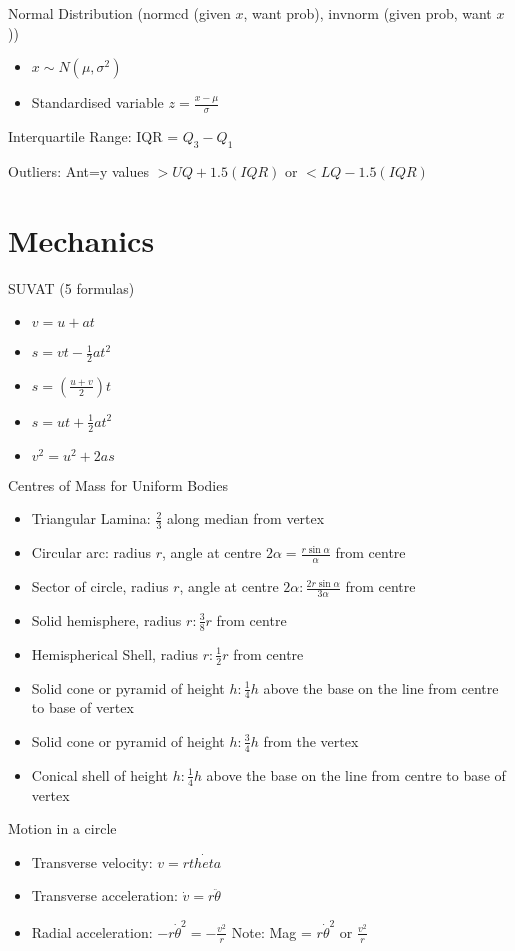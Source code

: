 \documentclass[10pt,a4paper,oneside]{book}
\begin{document}
Normal Distribution (normcd (given $x$, want prob), invnorm (given prob, want $x$))
\begin{itemize}
    \item $x\sim N(\mu,\sigma^2)$
    \item Standardised variable $z=\frac{x-\mu}{\sigma}$
\end{itemize}

Interquartile Range: IQR = $Q_3-Q_1$

Outliers: Ant=y values $>UQ+1.5(IQR)$ or $<LQ-1.5(IQR)$

\section*{Mechanics}
SUVAT (5 formulas)
\begin{itemize}
    \item $v=u+at$ 
    \item $s=vt-\frac{1}{2}at^2$
    \item $s=\left(\frac{u+v}{2}\right)t$
    \item $s=ut+\frac{1}{2}at^2$
    \item $v^2=u^2+2as$
\end{itemize}

Centres of Mass for Uniform Bodies 
\begin{itemize}
    \item Triangular Lamina: $\frac{2}{3}$ along median from vertex 
    \item Circular arc: radius $r$, angle at centre $2\alpha = \frac{r\sin\alpha}{\alpha}$ from centre 
    \item Sector of circle, radius $r$, angle at centre $2\alpha: \frac{2r\sin\alpha}{3\alpha}$ from centre 
    \item Solid hemisphere, radius $r:\frac{3}{8}r$ from centre 
    \item Hemispherical Shell, radius $r: \frac{1}{2}r$ from centre 
    \item Solid cone or pyramid of height $h: \frac{1}{4}h$ above the base on the line from centre to base of vertex 
    \item Solid cone or pyramid of height $h: \frac{3}{4}h$ from the vertex 
    \item Conical shell of height $h: \frac{1}{4}h$ above the base on the line from centre to base of vertex 
\end{itemize}

Motion in a circle 
\begin{itemize}
    \item Transverse velocity: $v=r\dot{theta}$
    \item Transverse acceleration: $\dot{v}=r\ddot{\theta}$
    \item Radial acceleration: $-r\dot{\theta}^2=-\frac{v^2}{r}$ Note: Mag = $r\dot{\theta}^2$ or $\frac{v^2}{r}$
\end{itemize}
\end{document}
